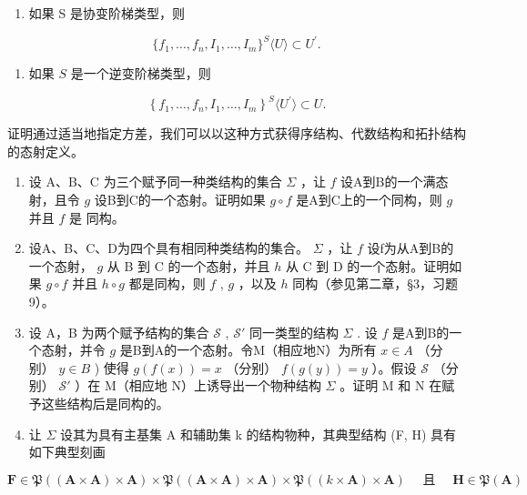 \begin{enumerate}
\def\labelenumi{(\roman{enumi})}
\tightlist
\item
  如果 S 是协变阶梯类型，则
\end{enumerate}

\[
\{f _ {1}, \dots , f _ {n}, I _ {1}, \dots , I _ {m} \} ^ {S} \langle U \rangle \subset U ^ {\prime}.
\]

\begin{enumerate}
\def\labelenumi{(\roman{enumi})}
\setcounter{enumi}{1}
\tightlist
\item
  如果 \(S\) 是一个逆变阶梯类型，则
\end{enumerate}

\[
\left\{f _ {1}, \dots , f _ {n}, I _ {1}, \dots , I _ {m} \right\} ^ {S} \langle U ^ {\prime} \rangle \subset U.
\]

证明通过适当地指定方差，我们可以以这种方式获得序结构、代数结构和拓扑结构的态射定义。

\begin{enumerate}
\def\labelenumi{\arabic{enumi}.}
\setcounter{enumi}{2}
\item
  设 A、B、C 为三个赋予同一种类结构的集合 \(\Sigma\) ，让 \(f\) 设A到B的一个满态射，且令 \(g\) 设B到C的一个态射。证明如果 \(g \circ f\) 是A到C上的一个同构，则 \(g\) 并且 \(f\) 是 同构。
\item
  设A、B、C、D为四个具有相同种类结构的集合。 \(\Sigma\) ，让 \(f\) 设f为从A到B的一个态射， \(g\) 从 B 到 C 的一个态射，并且 \(h\) 从 C 到 D 的一个态射。证明如果 \(g \circ f\) 并且 \(h \circ g\) 都是同构，则 \(f\) , \(g\) ，以及 \(h\) 同构（参见第二章，§3，习题9）。
\item
  设 A，B 为两个赋予结构的集合 \(\mathcal{S}\) , \(\mathcal{S}'\) 同一类型的结构 \(\Sigma\) . 设 \(f\) 是A到B的一个态射，并令 \(g\) 是B到A的一个态射。令M（相应地N）为所有 \(x \in A\) （分别） \(y \in B\) ) 使得 \(g(f(x)) = x\) （分别） \(f(g(y)) = y\) ）。假设 \(\mathcal{S}\) （分别） \(\mathcal{S}'\) ）在 M（相应地 N）上诱导出一个物种结构 \(\Sigma\) 。证明 M 和 N 在赋予这些结构后是同构的。
\item
  让 \(\Sigma\) 设其为具有主基集 A 和辅助集 k 的结构物种，其典型结构 (F, H) 具有如下典型刻画
\end{enumerate}

\[
\mathbf {F} \in \mathfrak {P} ((\mathbf {A} \times \mathbf {A}) \times \mathbf {A}) \times \mathfrak {P} ((\mathbf {A} \times \mathbf {A}) \times \mathbf {A}) \times \mathfrak {P} ((k \times \mathbf {A}) \times \mathbf {A}) \quad \text { 且 } \quad \mathbf {H} \in \mathfrak {P} (\mathbf {A})
\]

